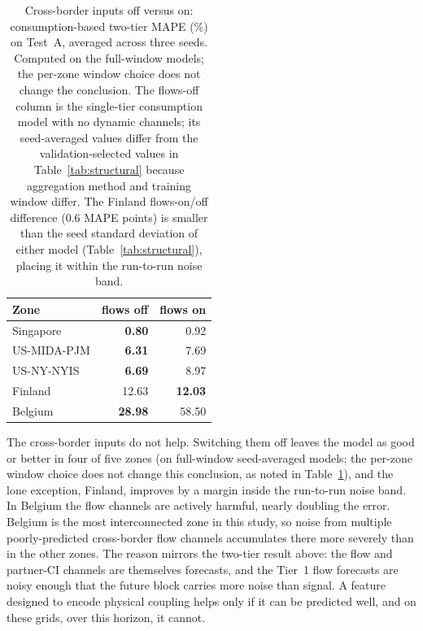 \documentclass[sigconf,nonacm,a4paper]{acmart}  %
\begin{document}
\begin{table}[H]
    \caption{Cross-border inputs off versus on: consumption-based two-tier MAPE (\%) on
    Test~A, averaged across three seeds. Computed on the full-window models; the
    per-zone window choice does not change the conclusion. The flows-off column is the
    single-tier consumption model with no dynamic channels; its seed-averaged values
    differ from the validation-selected values in Table~\ref{tab:structural} because
    aggregation method and training window differ. The Finland flows-on/off difference
    (0.6 MAPE points) is smaller than the seed standard deviation of either model
    (Table~\ref{tab:structural}), placing it within the run-to-run noise band.}
    \label{tab:flow}
    \begin{tabular}{lrr}
    \toprule
    Zone & flows off & flows on \\
    \midrule
    Singapore   & \textbf{0.80}  & 0.92 \\
    US-MIDA-PJM & \textbf{6.31}  & 7.69 \\
    US-NY-NYIS  & \textbf{6.69}  & 8.97 \\
    Finland     & 12.63 & \textbf{12.03} \\
    Belgium     & \textbf{28.98} & 58.50 \\
    \bottomrule
    \end{tabular}
\end{table}

The cross-border inputs do not help. Switching them off leaves the model as good or
better in four of five zones (on full-window seed-averaged models; the per-zone window
choice does not change this conclusion, as noted in Table~\ref{tab:flow}), and the
lone exception, Finland, improves by a margin
inside the run-to-run noise band. In Belgium the flow channels are actively harmful,
nearly doubling the error. Belgium is the most interconnected zone in this study,
so noise from multiple poorly-predicted cross-border flow channels accumulates there
more severely than in the other zones. The reason mirrors the two-tier result above: the flow and
partner-CI channels are themselves forecasts, and the Tier~1 flow forecasts are noisy
enough that the future block carries more noise than signal. A feature designed to
encode physical coupling helps only if it can be predicted well, and on these grids,
over this horizon, it cannot.


\end{document}
